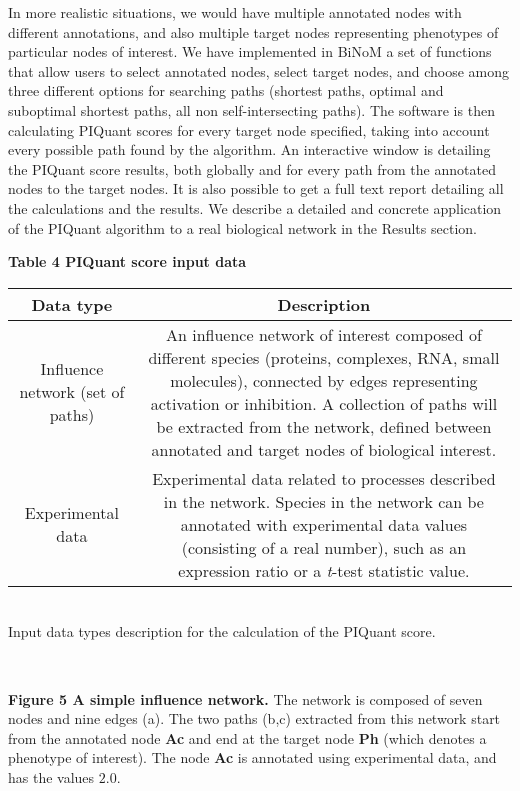 \documentclass[11pt]{bmc_article_s50}
\newenvironment{bmcformat}{\begin{raggedright}\baselineskip20pt\sloppy\setboolean{publ}{false}}{\end{raggedright}\baselineskip20pt\sloppy}
\begin{document}
\begin{bmcformat}
In more realistic situations, we would have multiple annotated nodes with different
 annotations, and also multiple target nodes representing phenotypes of
particular nodes of interest. We have implemented in BiNoM a set of functions
that allow users to select annotated nodes, select target nodes, and choose among
three different options for searching paths (shortest paths, optimal and
suboptimal shortest paths, all non self-intersecting paths). The software is then
calculating PIQuant scores for every target node specified, taking into account
every possible path found by the algorithm. An interactive window is detailing
the PIQuant score results, both globally and for every path from the annotated
nodes to the target nodes. It is also possible to get a full text report
detailing all the calculations and the results. We describe a detailed
and concrete application of the PIQuant algorithm to a real biological network
in the Results section.

\begin{table}[!h]
  \textbf{Table 4 PIQuant score input data}

      \begin{tabular*}{\textwidth}{@{\extracolsep\fill}cc}
        \hline
    \textbf{Data type} & \textbf{Description} \\
    \hline
        Influence network (set of paths) & \parbox{10cm}{\null An influence network of
interest composed of different species (proteins, complexes, RNA, small
molecules), connected by edges representing activation or inhibition. A
collection of paths will be extracted from the network, defined between annotated
and target nodes of biological interest.\null} \\
\hline
        Experimental data & \parbox{10cm}{\null Experimental data related to
processes described in the network. Species in the network can be annotated with
experimental data values (consisting of a real number), such as an expression
ratio or a \textit{t}-test statistic value.\null}  \\
\hline
      \end{tabular*}\\
       Input data types description for the calculation of the PIQuant score.
      \end{table}


\hrulefill\

\vspace*{-15pt}
\textbf{Figure 5 A simple influence network.}
The network is composed of seven nodes and nine edges (a). The two paths (b,c)
extracted from this network start from the annotated node \textbf{Ac} and end at
the target node \textbf{Ph} (which denotes a phenotype of interest). The node
\textbf{Ac} is annotated using experimental data, and has the
values $2.0$.


\end{bmcformat}
\end{document}
